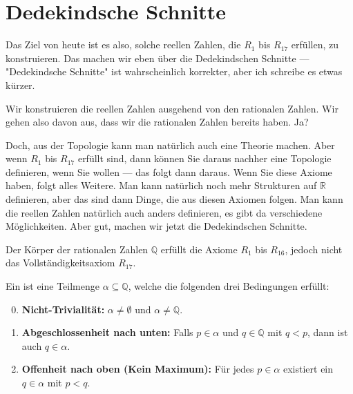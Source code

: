 \section{Dedekindsche Schnitte}

\begin{spoken-clean}[00:20:15 - 00:22:30]
Das Ziel von heute ist es also, solche reellen Zahlen, die $R_1$ bis $R_{17}$ erfüllen, zu konstruieren. Das machen wir eben über die Dedekindschen Schnitte --- "Dedekindsche Schnitte" ist wahrscheinlich korrekter, aber ich schreibe es etwas kürzer.

Wir konstruieren die reellen Zahlen ausgehend von den rationalen Zahlen. Wir gehen also davon aus, dass wir die rationalen Zahlen bereits haben. Ja?


Doch, aus der Topologie kann man natürlich auch eine Theorie machen. Aber wenn $R_1$ bis $R_{17}$ erfüllt sind, dann können Sie daraus nachher eine Topologie definieren, wenn Sie wollen --- das folgt dann daraus. Wenn Sie diese Axiome haben, folgt alles Weitere. Man kann natürlich noch mehr Strukturen auf $\mathbb{R}$ definieren, aber das sind dann Dinge, die aus diesen Axiomen folgen. Man kann die reellen Zahlen natürlich auch anders definieren, es gibt da verschiedene Möglichkeiten. Aber gut, machen wir jetzt die Dedekindschen Schnitte.
\end{spoken-clean}

\begin{math-stroke}
Der Körper der rationalen Zahlen $\mathbb{Q}$ erfüllt die Axiome $R_1$ bis $R_{16}$, jedoch nicht das Vollständigkeitsaxiom $R_{17}$.

\begin{definition}\label{def:dedekindscher-schnitt}
Ein  ist eine Teilmenge $\alpha \subseteq \mathbb{Q}$, welche die folgenden drei Bedingungen erfüllt:
\begin{enumerate}[label=\textbf{(D\arabic*)}]
    \setcounter{enumi}{-1}
    \item \textbf{Nicht-Trivialität:} $\alpha \neq \emptyset$ und $\alpha \neq \mathbb{Q}$.
    \item \textbf{Abgeschlossenheit nach unten:} Falls $p \in \alpha$ und $q \in \mathbb{Q}$ mit $q < p$, dann ist auch $q \in \alpha$.
    \item \textbf{Offenheit nach oben (Kein Maximum):} Für jedes $p \in \alpha$ existiert ein $q \in \alpha$ mit $p < q$.
\end{enumerate}
\end{definition}
\end{math-stroke}

